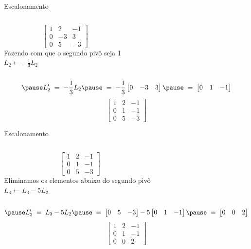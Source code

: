 \begin{resolution}{Escalonamento}
\begin{columns}
  \[\;\;\;
  \begin{bmatrix}
    1 & 2  & -1 \\
    0 & -3 & 3  \\
    0 & 5  & -3
  \end{bmatrix}
  \]
  \pause
{}
  Fazendo com que o segundo pivô seja 1
  \\ \pause
  \(
  L_2 \leftarrow -\frac{1}{3}L_2
  \)
\end{columns}
\vspace{-\baselineskip}
\[
  \pause
  L'_2
  \;=\;
  -\frac{1}{3}L_2
  \pause
  \;=\;
  -\frac{1}{3}
  \begin{bmatrix}
    0 & -3 & 3
  \end{bmatrix}
  \pause
  \;=\;
  \begin{bmatrix}
    0 & 1 & -1
  \end{bmatrix}
\]
\pause
\[
  \begin{bmatrix}
    1 & 2 & -1 \\
    0 & 1 & -1 \\
    0 & 5 & -3
  \end{bmatrix}
\]
\end{resolution}

\begin{resolution}{Escalonamento}
\begin{columns}
  \[\;\;\;
  \begin{bmatrix}
    1 & 2 & -1 \\
    0 & 1 & -1 \\
    0 & 5 & -3
  \end{bmatrix}
  \]
  \pause
{}
  Eliminamos os elementos abaixo do segundo pivô
  \\ \pause
  \(
    L_3 \leftarrow L_3 - 5 L_2
  \)
\end{columns}
\vspace{-\baselineskip}
\[
  \pause
  L'_3
  \;=\;
  L_3 - 5 L_2
  \pause
  \;=\;
  \begin{bmatrix}
    0 & 5 & -3
  \end{bmatrix}
  - 5
  \begin{bmatrix}
    0 & 1 & -1
  \end{bmatrix}
  \pause
  \;=\;
  \begin{bmatrix}
    0 & 0 & 2
  \end{bmatrix}
\]
\pause
\[
  \begin{bmatrix}
    1 & 2 & -1 \\
    0 & 1 & -1 \\
    0 & 0 & 2
  \end{bmatrix}
\]
\end{resolution}

